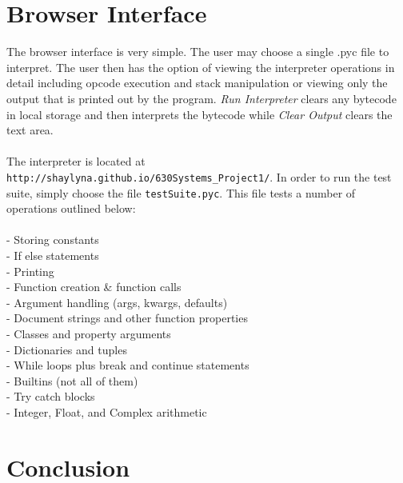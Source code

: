 \documentclass{article}
\begin{document}
\section{Browser Interface}

The browser interface is very simple.  The user may choose a single .pyc file to interpret.  The user then has the option of viewing the interpreter operations in detail including opcode execution and stack manipulation or viewing only the output that is printed out by the program.  {\em Run Interpreter} clears any bytecode in local storage and then interprets the bytecode while {\em Clear Output} clears the text area.\\
\\
The interpreter is located at \verb!http://shaylyna.github.io/630Systems_Project1/!.  In order to run the test suite, simply choose the file \verb!testSuite.pyc!.  This file tests a number of operations outlined below:\\
\\
- Storing constants\\
- If else statements\\
- Printing\\
- Function creation \& function calls\\
- Argument handling (args, kwargs, defaults)\\
- Document strings and other function properties\\
- Classes and property arguments\\
- Dictionaries and tuples\\
- While loops plus break and continue statements\\
- Builtins (not all of them)\\
- Try catch blocks\\
- Integer, Float, and Complex arithmetic\\

\section{Conclusion}
\end{document}
